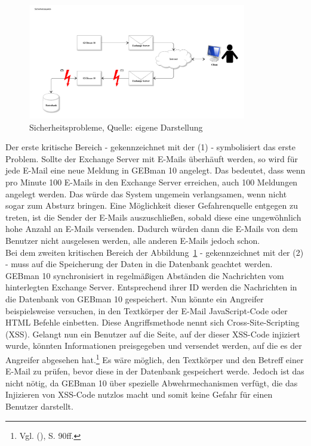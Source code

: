 \begin{figure}[h!]
\centering
\includegraphics[width=0.85\textwidth]{Abbildungen/Sicherheitsaspekte.pdf}
	\caption[Sicherheitsprobleme]{Sicherheitsprobleme, Quelle: eigene Darstellung}
	\label{fig:Sicherheitsprobleme}
\end{figure}

\noindent
Der erste kritische Bereich - gekennzeichnet mit der (1) - symbolisiert das erste Problem. Sollte der Exchange Server mit E-Mails überhäuft werden, so wird für jede E-Mail eine neue Meldung in GEBman 10 angelegt. Das bedeutet, dass wenn pro Minute 100 E-Mails in den Exchange Server erreichen, auch 100 Meldungen angelegt werden. Das würde das System ungemein verlangsamen, wenn nicht sogar zum Absturz bringen. Eine Möglichkeit dieser Gefahrenquelle entgegen zu treten, ist die Sender der E-Mails auszuschließen, sobald diese eine ungewöhnlich hohe Anzahl an E-Mails versenden. Dadurch würden dann die E-Mails von dem Benutzer nicht ausgelesen werden, alle anderen E-Mails jedoch schon.\\

\noindent
Bei dem zweiten kritischen Bereich der Abbildung~\ref{fig:Sicherheitsprobleme} - gekennzeichnet mit der (2) - muss auf die Speicherung der Daten in die Datenbank geachtet werden. GEBman 10 synchronisiert in regelmäßigen Abständen die Nachrichten vom hinterlegten Exchange Server. Entsprechend ihrer ID werden die Nachrichten in die Datenbank von GEBman 10 gespeichert. Nun könnte ein Angreifer beispielsweise versuchen, in den Textkörper der E-Mail JavaScript-Code oder HTML Befehle einbetten. Diese Angriffsmethode nennt sich Cross-Site-Scripting (XSS). Gelangt nun ein Benutzer auf die Seite, auf der dieser XSS-Code injiziert wurde, könnten Informationen preisgegeben und versendet werden, auf die es der Angreifer abgesehen hat.\footnote{Vgl. \citeauthor{Rohr} (\citeyear{Rohr}), S. 90ff.}\newline
Es wäre möglich, den Textkörper und den Betreff einer E-Mail zu prüfen, bevor diese in der Datenbank gespeichert werde. Jedoch ist das nicht nötig, da GEBman 10 über spezielle Abwehrmechanismen verfügt, die das Injizieren von XSS-Code nutzlos macht und somit keine Gefahr für einen Benutzer darstellt.

 

